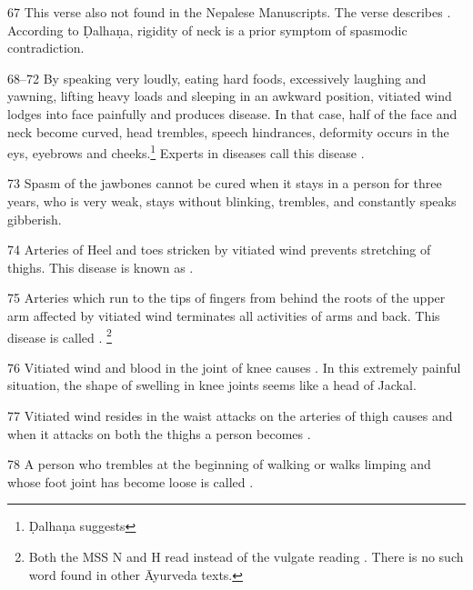 \begin{translation}
\item[67] This verse also not found in the Nepalese Manuscripts. The verse 
describes . According to Ḍalhaṇa, rigidity 
of neck is a prior symptom of spasmodic contradiction. 

\item[68--72] By speaking very loudly, eating hard foods, excessively laughing 
and yawning, lifting heavy loads and sleeping in an awkward position, vitiated 
wind lodges into face painfully and produces  disease. In that case, half of the face and neck become curved, head 
trembles, speech hindrances, deformity occurs in the eys, eyebrows and 
cheeks.\footnote{Ḍalhaṇa suggests } Experts in diseases call this disease . 

\item[73] Spasm of the jawbones cannot be cured when it stays in a person for three years, who is very weak, stays without blinking, trembles, and constantly speaks gibberish.

\item[74] Arteries of Heel and toes stricken by vitiated wind prevents stretching 
of thighs. This disease is known as .

\item[75] Arteries which run to the tips of fingers from behind the roots of the 
upper arm affected by vitiated wind terminates all activities of arms and back. 
This disease is called . \footnote{Both 
the MSS N and H read  instead of the vulgate reading 
. There is no such word found in other Āyurveda texts.}

\item[76] Vitiated wind and blood in the joint of knee causes 
. In this extremely painful situation, the 
shape of swelling in knee joints seems like a head of Jackal. 

\item[77] Vitiated wind resides in the waist attacks on the arteries of thigh 
causes  and when it attacks on both the thighs a person 
becomes .

\item[78] A person who trembles at the beginning of walking or walks limping 
and whose foot joint has become loose is called .


\end{translation}
